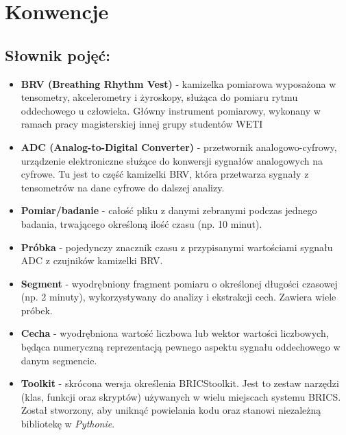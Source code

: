 \chapter{Konwencje}
	\section{Słownik pojęć:}

	\begin{itemize}
		\item \textbf{BRV (Breathing Rhythm Vest)} - kamizelka pomiarowa wyposażona w tensometry, akcelerometry i 
		żyroskopy, służąca do pomiaru rytmu oddechowego u człowieka. Główny instrument pomiarowy, wykonany
		w ramach pracy magisterskiej innej grupy studentów WETI
		\item \textbf{ADC (Analog-to-Digital Converter)} - przetwornik analogowo-cyfrowy, urządzenie elektroniczne
		służące do konwersji sygnałów analogowych na cyfrowe. Tu jest to część kamizelki BRV, która przetwarza
		sygnały z tensometrów na dane cyfrowe do dalszej analizy.
		\item \textbf{Pomiar/badanie} - całość pliku z danymi zebranymi podczas jednego badania, trwającego 
		określoną ilość czasu (np. 10 minut).
		\item \textbf{Próbka} - pojedynczy znacznik czasu z przypisanymi wartościami sygnału ADC z czujników
		kamizelki BRV.
		\item \textbf{Segment} - wyodrębniony fragment pomiaru o określonej długości czasowej (np. 2 minuty), 
		wykorzystywany do analizy i ekstrakcji cech. Zawiera wiele próbek.
		\item \textbf{Cecha} - wyodrębniona wartość liczbowa lub wektor wartości liczbowych, będąca numeryczną
		reprezentacją pewnego aspektu sygnału oddechowego w danym segmencie.
		\item \textbf{Toolkit} - skrócona wersja określenia BRICStoolkit. Jest to zestaw narzędzi
		(klas, funkcji oraz skryptów) używanych w wielu miejscach systemu BRICS. Został stworzony,
		aby uniknąć powielania kodu oraz stanowi niezależną bibliotekę w \textit{Pythonie}.
	\end{itemize}

